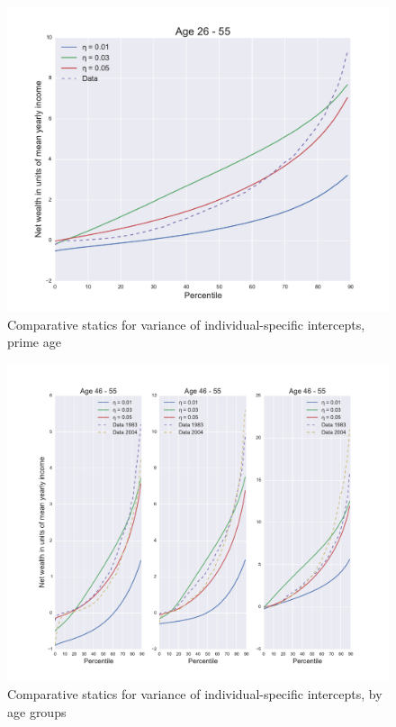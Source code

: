 \begin{figure}
\includegraphics[width=\columnwidth]{comp_stat_eta}
\caption{Comparative statics for variance of individual-specific intercepts, prime age}
\label{fig:comp_stat_eta}
\end{figure}

\begin{figure}
\includegraphics[width=\columnwidth]{comp_stat_eta_agedetail}
\caption{Comparative statics for variance of individual-specific intercepts, by age groups}
\label{fig:comp_stat_eta_agedetail}
\end{figure}

